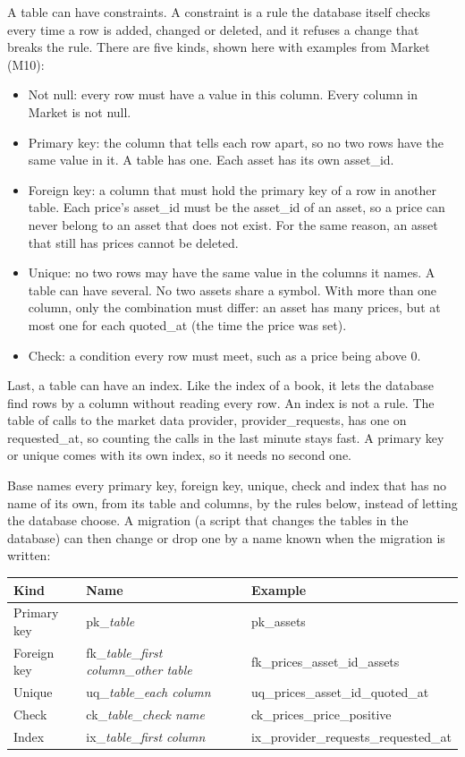 \documentclass[12pt, titlepage]{article}
\begin{document}
\medskip
\noindent A table can have constraints. A constraint is a rule the database
itself checks every time a row is added, changed or deleted, and it refuses a
change that breaks the rule. There are five kinds, shown here with examples
from Market (M10):
\begin{itemize}
\item Not null: every row must have a value in this column. Every column in
  Market is not null.
\item Primary key: the column that tells each row apart, so no two rows have
  the same value in it. A table has one. Each asset has its own asset\_id.
\item Foreign key: a column that must hold the primary key of a row in another
  table. Each price's asset\_id must be the asset\_id of an asset, so a price
  can never belong to an asset that does not exist. For the same reason, an
  asset that still has prices cannot be deleted.
\item Unique: no two rows may have the same value in the columns it names. A
  table can have several. No two assets share a symbol. With more than one
  column, only the combination must differ: an asset has many prices, but at
  most one for each quoted\_at (the time the price was set).
\item Check: a condition every row must meet, such as a price being above 0.
\end{itemize}
Last, a table can have an index. Like the index of a book, it lets the
database find rows by a column without reading every row. An index is not a
rule. The table of calls to the market data provider, provider\_requests, has
one on requested\_at, so counting the calls in the last minute stays fast. A
primary key or unique comes with its own index, so it needs no second one.

\medskip
\noindent Base names every primary key, foreign key, unique, check and index
that has no name of its own, from its table and columns, by the rules below,
instead of letting the database choose. A migration (a script that changes the
tables in the database) can then change or drop one by a name known when the
migration is written:

\begin{center}
\begin{tabular}{p{2.4cm} p{5.6cm} p{6.6cm}}
\toprule
\textbf{Kind} & \textbf{Name} & \textbf{Example} \\
\midrule
Primary key & pk\_\textit{table} & pk\_assets \\
Foreign key & fk\_\textit{table}\_\textit{first column}\_\textit{other table} & fk\_prices\_asset\_id\_assets \\
Unique & uq\_\textit{table}\_\textit{each column} & uq\_prices\_asset\_id\_quoted\_at \\
Check & ck\_\textit{table}\_\textit{check name} & ck\_prices\_price\_positive \\
Index & ix\_\textit{table}\_\textit{first column} & ix\_provider\_requests\_requested\_at \\
\bottomrule
\end{tabular}
\end{center}
\end{document}
